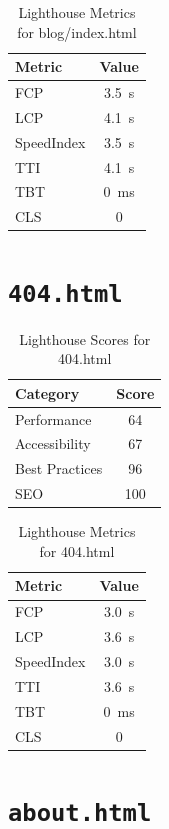     \begin{table}[H]
    \centering
    \caption{Lighthouse Metrics for blog/index.html}
    \begin{tabular}{|l|c|}
    \hline
    Metric & Value \\ \hline
    FCP & 3.5 s \\ \hline
    LCP & 4.1 s \\ \hline
    SpeedIndex & 3.5 s \\ \hline
    TTI & 4.1 s \\ \hline
    TBT & 0 ms \\ \hline
    CLS & 0 \\ \hline
    \end{tabular}
    \end{table}
    \section{\texttt{404.html}}

    \begin{table}[H]
    \centering
    \caption{Lighthouse Scores for 404.html}
    \begin{tabular}{|l|c|}
    \hline
    Category & Score \\ \hline
    Performance & 64 \\ \hline
    Accessibility & 67 \\ \hline
    Best Practices & 96 \\ \hline
    SEO & 100 \\ \hline
    \end{tabular}
    \end{table}

    \begin{table}[H]
    \centering
    \caption{Lighthouse Metrics for 404.html}
    \begin{tabular}{|l|c|}
    \hline
    Metric & Value \\ \hline
    FCP & 3.0 s \\ \hline
    LCP & 3.6 s \\ \hline
    SpeedIndex & 3.0 s \\ \hline
    TTI & 3.6 s \\ \hline
    TBT & 0 ms \\ \hline
    CLS & 0 \\ \hline
    \end{tabular}
    \end{table}
    \section{\texttt{about.html}}

